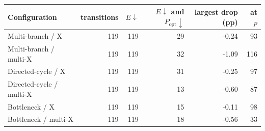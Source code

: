 \begin{tabular}{lrrrrr}
\toprule
Configuration & transitions & $E\downarrow$ & $E\downarrow$ and $P_{\mathrm{opt}}\downarrow$ & largest drop (pp) & at $p$ \\
\midrule
Multi-branch / X & 119 & 119 & 29 & -0.24 & 93 \\
Multi-branch / multi-X & 119 & 119 & 32 & -1.09 & 116 \\
Directed-cycle / X & 119 & 119 & 31 & -0.25 & 97 \\
Directed-cycle / multi-X & 119 & 119 & 13 & -0.60 & 87 \\
Bottleneck / X & 119 & 119 & 15 & -0.11 & 98 \\
Bottleneck / multi-X & 119 & 119 & 18 & -0.56 & 33 \\
\bottomrule
\end{tabular}

